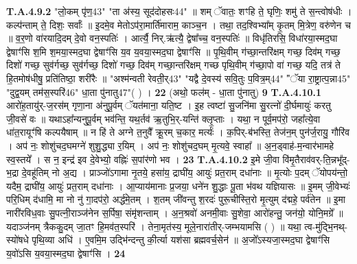 \documentclass[17pt]{extarticle}
\begin{document}
                  \newline
                                                                  \textbf{ T.A.4.9.2} \newline
                  "लो॒कम् पृ॑ण॒{43}" "ता अ॑स्य॒ सूद॑दोहसः{44}" ॥  शम् ॅवातः॒ शꣳहि ते॒ घृणिः॒ शमु॑ ते स॒न्त्वोष॑धीः । कल्प॑न्ताम् ते॒ दिशः॒ सर्वाः᳚ ॥ इ॒दमे॒व मेतोऽप॑रा॒मार्ति॑माराम॒ काञ्च॒न ।  तथा॒ तद॒श्विभ्या᳚म् कृ॒तम् मि॒त्रेण॒ वरु॑णेन च ॥  व॒र॒णो वा॑रयादि॒दम् दे॒वो वन॒स्पतिः॑ ।  आर्त्यै॒ निर्.ऋ॑त्यै॒ द्वेषा᳚च्च॒ वन॒स्पतिः॑ ॥  विधृ॑तिरसि॒ विधा॑रया॒स्मद॒घा द्वेषाꣳ॑सि श॒मि श॒मया॒स्मद॒घा द्वेषाꣳ॑सि य॒व य॒वया॒स्मद॒घा द्वेषाꣳ॑सि ॥  पृ॒थि॒वीम् ग॑च्छा॒न्तरि॑क्षम् गच्छ॒ दिव॑म् गच्छ॒ दिशो॑ गच्छ॒ सुव॑र्गच्छ॒ सुव॑र्गच्छ॒ दिशो॑ गच्छ॒ दिव॑म् गच्छा॒न्तरि॑क्षम् गच्छ पृथि॒वीम् ग॑च्छा॒पो वा॑ गच्छ॒ यदि॒ तत्र॑ ते हि॒तमोष॑धीषु॒ प्रति॑तिष्ठा॒ शरी॑रैः ॥ "अश्म॑न्वती रेवती॒र्{43}" "यद्वै दे॒वस्य॑ सवि॒तुः प॒वित्र॒म्{44}"  "ॅया रा॒ष्ट्रात्प॒न्ना{45}" "दुद्व॒यम् तम॑स॒स्परि॑{46}"  धा॒ता पु॑नातु{47}"( ) । \textbf{ 22} \newline
                  \newline
                                                        (अथो॒ फल॑म् - धा॒ता पु॑नातु) \textbf{9} \newline \newline
                                \textbf{ T.A.4.10.1} \newline
                  आरो॑ह॒तायु॑र्-ज॒रस॑म् गृणा॒ना अ॑नुपू॒र्वम् ॅयत॑माना॒ यति॒ष्ट । इ॒ह त्वष्टा॑ सु॒जनि॑मा सु॒रत्नो॑ दी॒र्घमायुः॑ करतु जी॒वसे॑ वः ॥  यथाऽहा᳚न्यनुपू॒र्वम् भव॑न्ति॒ यथ॒र्तव॑ ऋ॒तुभि॒र्-यन्ति॑ क्लृ॒प्ताः । यथा॒ न पूर्व॒मप॑रो॒ जहा᳚त्ये॒वा धा॑त॒रायूꣳ॑षि कल्पयैषाम् ॥  न हि॑ ते अग्ने त॒नुवै᳚ क्रू॒रम् च॒कार॒ मर्त्यः॑ ।  क॒पिर्-ब॑भस्ति॒ तेज॑न॒म् पुन॑र्ज॒रायु॒ गौरि॑व ।  अप॑ नः॒ शोशु॑चद॒घमग्ने॑ शुशु॒द्ध्या र॒यिम् ।  अप॑ नः॒ शोशु॑चद॒घम् मृ॒त्यवे॒ स्वाहा᳚ ॥  अ॒न॒ड्वाह॑-म॒न्वार॑भामहे स्व॒स्तये᳚ ।  स न॒ इन्द्र॑ इव दे॒वेभ्यो॒ वह्निः॑ स॒पांर॑णो भव । \textbf{ 23} \newline
                  \newline
                                                                  \textbf{ T.A.4.10.2} \newline
                  इ॒मे जी॒वा वि॑मृ॒तैराव॑वर्-ति॒न्नभू᳚द्-भ॒द्रा दे॒वहू॑तिम् नो अ॒द्य । प्राञ्जो॑ऽगामा नृ॒तये॒ हसा॑य॒ द्राघी॑य॒ आयुः॑ प्रत॒राम् दधा॑नाः ॥  मृ॒त्योः प॒दम् ॅयोपय॑न्तो॒ यदैम॒ द्राघी॑य॒ आयुः॑ प्रत॒राम् दधा॑नाः । आ॒प्याय॑मानाः प्र॒जया॒ धने॑न शु॒द्धाः पू॒ता भ॑वथ यज्ञियासः ॥  इ॒मम् जी॒वेभ्यः॑ परि॒धिम् द॑धामि॒ मा नो नु॑ गा॒दप॑रो॒ अर्द्ध॑मे॒तम् ।  श॒तम् जी॑वन्तु श॒रदः॑ पुरू॒चीस्ति॒रो मृ॒त्युम् द॑द्महे॒ पर्व॑तेन ॥ इ॒मा नारी॑रविध॒वाः सु॒पत्नी॒राञ्ज॑नेन स॒र्पिषा॒ संमृ॑शन्ताम् ।  अ॒न॒श्रवो॑ अनमी॒वाः सु॒शेवा॒ आरो॑हन्तु॒ जन॑यो॒ योनि॒मग्रे᳚ ॥ यदाञ्ज॑नम् त्रैककु॒दम् जा॒तꣳ हि॒मव॑त॒स्परि॑ ।  तेना॒मृत॑स्य॒ मूले॒नारा॑तीर्-जम्भयामसि ( ) ॥  यथा॒ त्व-मु॑द्भि॒नथ्-स्यो॑षधे पृथि॒व्या अधि॑ ।  ए॒वमि॒म उद्भि॑न्दन्तु की॒र्त्या यश॑सा ब्रह्मवर्च॒सेन॑ ॥ अ॒जो᳚ऽस्यजा॒स्मद॒घा द्वेषाꣳ॑सि य॒वो॑ऽसि य॒वया॒स्मद॒घा द्वेषाꣳ॑सि । \textbf{ 24} \newline
\end{document}

